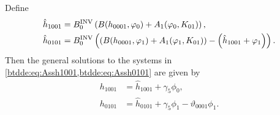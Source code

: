 Define
\begin{equation*}
\begin{aligned}
    \hat h_{1001} &= B^{\mathrm{INV}}_{0} \left(B(h_{0001},\varphi_0) + A_1(\varphi_0,K_{01})\right), \\
    \hat h_{0101} &= B^{\mathrm{INV}}_{0} \left(\left(B(h_{0001},\varphi_1) + A_1(\varphi_1,K_{01})\right)-\left(\hat h_{1001} + \varphi_1\right)\right). \\
\end{aligned}
\end{equation*}
Then the general solutions to the systems in \cref{btdde:eq:Assh1001,btdde:eq:Assh0101} are given by
\begin{equation*}
\begin{aligned}
h_{1001} &= \hat h_{1001} + \gamma_5 \phi_0, \\
h_{0101} &= \hat h_{0101} + \gamma_5 \phi_1 - \vartheta_{0001} \phi_1. \\
\end{aligned}
\end{equation*}

